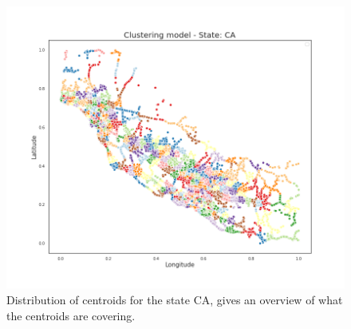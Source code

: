 \documentclass[../main.tex]{subfiles}
\begin{document}
\begin{figure}[H]
\centering
\includegraphics[width=15cm]{Images/Clustering_centroids.png}
\caption{Distribution of centroids for the state CA, gives an overview of what the centroids are covering.}
\label{fig:Clustering_centroids}
\end{figure}
\end{document}

